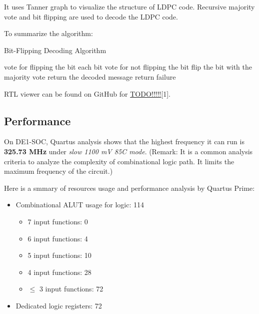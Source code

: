 \documentclass[conference]{IEEEtran}
\begin{document}
It uses Tanner graph to visualize the structure of LDPC code. Recursive majority vote and bit flipping are used to decode the LDPC code. 

To summarize the algorithm:
\begin{algorithm}
  \caption{Bit-Flipping Decoding Algorithm}
  \begin{algorithmic}
          \STATE vote for flipping the bit
        \ELSE
        \ENDIF
      \ENDFOR
      \STATE each bit vote for not flipping the bit
      \STATE flip the bit with the majority vote
    \ENDWHILE
    \STATE return the decoded message
    \ELSE
    \STATE return failure
    \ENDIF
  \end{algorithmic}
\end{algorithm}

RTL viewer can be found on GitHub for \href{https://github.com/luckunately/ELEC433-Projects}{TODO!!!!!}[1]. 
\subsection{Performance}
On DE1-SOC, Quartus analysis shows that the highest frequency it can run is \textbf{325.73 MHz} under \textit{slow 1100 mV 85C mode}. (Remark: It is a common analysis criteria to analyze the complexity of combinational logic path. It limits the maximum frequency of the circuit.)

Here is a smmary of resources usage and performance analysis by Quartus Prime:
\begin{itemize}
  \item Combinational ALUT usage for logic: 114 \begin{itemize}
    \item 7 input functions: 0
    \item 6 input functions: 4
    \item 5 input functions: 10
    \item 4 input functions: 28
    \item $\leq$ 3 input functions: 72
  \end{itemize}
  \item Dedicated logic registers: 72
\end{itemize}
\end{document}
